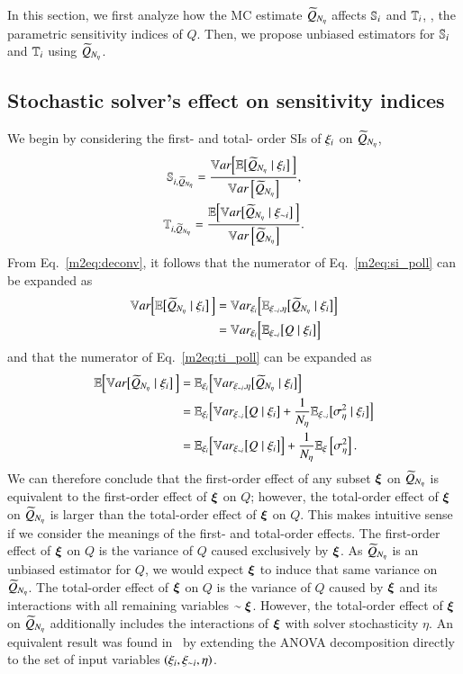 In this section, we first analyze how the MC estimate $\Qpoll$ affects $\S{i}$ and $\T{i}$, \ie, the parametric sensitivity indices of $Q$.
Then, we propose unbiased estimators for $\S{i}$ and $\T{i}$ using $\Qpoll$.

\subsection{Stochastic solver's effect on sensitivity indices}
We begin by considering the first- and total- order SIs of $\xii$ on $\Qpoll$,
\begin{gather}\label{m2eq:si_poll}
    \Spoll{i} = \frac{\VE{\Qpoll \mid \xii}}{\Var{\Qpoll}} , \\ \label{m2eq:ti_poll}
    \Tpoll{i} = \frac{\EV{\Qpoll \mid \xini}}{\Var{\Qpoll}} .
\end{gather}
From Eq.~\eqref{m2eq:deconv}, it follows that the numerator of Eq.~\eqref{m2eq:si_poll} can be expanded as
\begin{align} \nonumber
    \VE{\Qpoll \mid \xii} &= \Vsub{\xii}\Brac{ \E{\xini,\eta} \brac{\Qpoll \mid \xii} } \\ \label{m2eq:ve-deconv}
    &= \Vsub{\xii} \Brac{\E{\xini} \brac{Q \mid \xii}} 
\end{align}
and that the numerator of Eq.~\eqref{m2eq:ti_poll} can be expanded as
\begin{align} \nonumber
    \EV{\Qpoll \mid \xii} &= \E{\xii} \Brac{ \Vsub{\xini,\eta} \brac{\Qpoll \mid \xii} } \\ \nonumber
    &= \E{\xii} \Brac{\Vsub{\xini} \brac{Q\mid \xii} + \frac{1}{\Neta}\E{\xini} \brac{\Sigsqeta \mid \xii}} \\ \label{m2eq:ev-deconv}
    &= \E{\xii} \Brac{\Vsub{\xini} \brac{Q \mid \xii}} + \frac{1}{\Neta}\EExi{\Sigsqeta} .
\end{align}
%
We can therefore conclude that the first-order effect of any subset $\bxi$ on $\Qpoll$ is equivalent to the first-order effect of $\bxi$ on $Q$; 
however, the total-order effect of $\bxi$ on $\Qpoll$ is larger than the total-order effect of $\bxi$ on $Q$.
This makes intuitive sense if we consider the meanings of the first- and total-order effects. 
The first-order effect of $\bxi$ on $Q$ is the variance of $Q$ caused exclusively by $\bxi$. 
As $\Qpoll$ is an unbiased estimator for $Q$, we would expect $\bxi$ to induce that same variance on $\Qpoll$. 
The total-order effect of $\bxi$ on $Q$ is the variance of $Q$ caused by $\bxi$ and its interactions with all remaining variables $\sim \bxi$. 
However, the total-order effect of $\bxi$ on $\Qpoll$ additionally includes the interactions of $\bxi$ with solver stochasticity $\eta$. 
An equivalent result was found in~\cite{marrel-etal-2012} by extending the ANOVA decomposition directly to the set of input variables $\left( \xii, \xini, \eta \right)$. 

